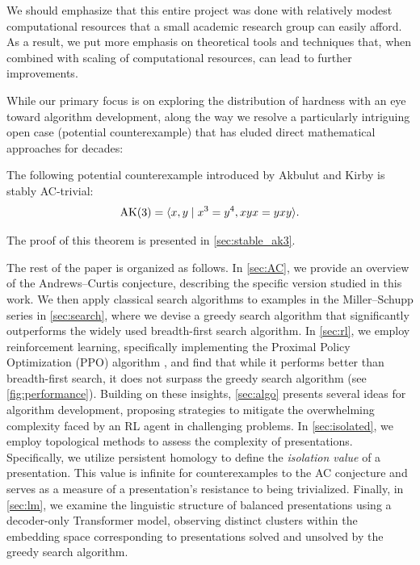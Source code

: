 We should emphasize that this entire project was done with relatively modest computational resources that a small academic research group can easily afford. As a result, we put more emphasis on theoretical tools and techniques that, when combined with scaling of computational resources, can lead to further improvements.

While our primary focus is on exploring the distribution of hardness with an eye toward algorithm development, along the way we resolve a particularly intriguing open case (potential counterexample) that has eluded direct mathematical approaches for decades:

\begin{theorem}\label{thm:stableAK3}
    The following potential counterexample introduced by Akbulut and Kirby \cite{Akbulut--Kirby} is stably AC-trivial:
    \[
    \text{AK}(3) = \langle x, y \mid x^3 = y^{4}, xyx = yxy\rangle.
    \]
\end{theorem}

\noindent
The proof of this theorem is presented in \autoref{sec:stable_ak3}.

The rest of the paper is organized as follows. In \autoref{sec:AC}, we provide an overview of the Andrews--Curtis conjecture, describing the specific version studied in this work. We then apply classical search algorithms to examples in the Miller--Schupp series in \autoref{sec:search}, where we devise a greedy search algorithm that significantly outperforms the widely used breadth-first search algorithm. In \autoref{sec:rl}, we employ reinforcement learning, specifically implementing the Proximal Policy Optimization (PPO) algorithm \cite{schulman2017proximal}, and find that while it performs better than breadth-first search, it does not surpass the greedy search algorithm (see \autoref{fig:performance}). Building on these insights, \autoref{sec:algo} presents several ideas for algorithm development, proposing strategies to mitigate the overwhelming complexity faced by an RL agent in challenging problems. In \autoref{sec:isolated}, we employ topological methods to assess the complexity of presentations. Specifically, we utilize persistent homology to define the \textit{isolation value} of a presentation. This value is infinite for counterexamples to the AC conjecture and serves as a measure of a presentation's resistance to being trivialized. Finally, in \autoref{sec:lm}, we examine the linguistic structure of balanced presentations using a decoder-only Transformer model, observing distinct clusters within the embedding space corresponding to presentations solved and unsolved by the greedy search algorithm.

